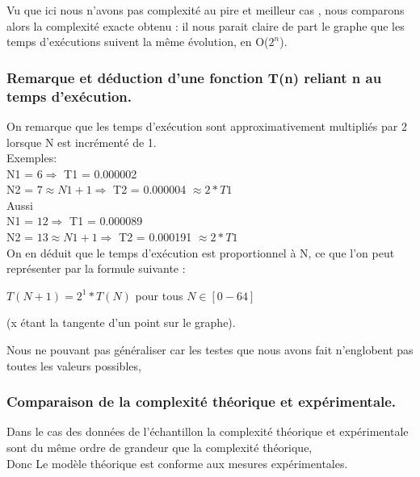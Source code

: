 \documentclass[12pt]{article}
\begin{document}
Vu que ici nous n'avons pas complexité au pire et meilleur cas , nous comparons alors la complexité exacte obtenu : il nous parait claire de part le graphe que les temps d'exécutions suivent la même évolution, en O($2^n$).

\subsubsection{Remarque et déduction d'une fonction T(n) reliant n au temps d'exécution.}

On remarque que les temps d'exécution sont approximativement multipliés par 2 lorsque N est incrémenté de 1.
\\

\color{blue}
Exemples:
\color{black} 
\\
N1 = $6  \Rightarrow  $  T1 = 0.000002
\\
N2 = $7 \approx N1 + 1  \Rightarrow  $  T2 = 0.000004 $\approx 2 * T1 $
\\

Aussi
\\
N1 = $12 \Rightarrow $  T1 = 0.000089
\\
N2 = $13 \approx N1 + 1 \Rightarrow $  T2 = 0.000191 $\approx 2 * T1 $
\\

On en déduit que le temps d'exécution est proportionnel à N, ce que l'on peut représenter par la formule suivante
: 
\begin{center}
\color{red}
	$T(N+1) = 2^1 *T(N)$ pour tous $ N \in [0 - 64] $	
	
\color{black}
(x étant la tangente d'un point sur le graphe).
\end{center}

Nous ne pouvant pas généraliser car les testes que nous avons fait n'englobent pas toutes les valeurs possibles, 
	



\subsubsection{Comparaison de la complexité théorique et expérimentale. }
Dans le cas des données de l'échantillon la complexité théorique et expérimentale sont du même ordre de grandeur que la complexité théorique,\\
\color{blue}
Donc Le modèle théorique est conforme aux mesures expérimentales.
\color{black}
\\
\end{document}
